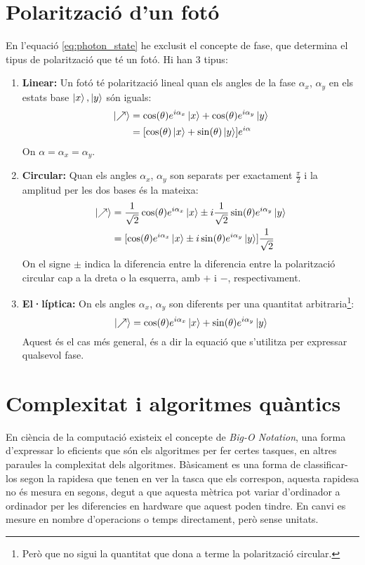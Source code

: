 \chapter{Polarització d'un fotó}
\label{appendix:optics}
En l'equació \ref{eq:photon_state} he exclusit el concepte de fase, que determina el tipus de polarització que té un fotó. Hi han 3 tipus:
\begin{enumerate}
	\item \textbf{Linear:}
	Un fotó té polarització lineal quan els angles de la fase $\alpha_x$, $\alpha_y$ en els estats base $\ket{x},\ket{y}$ són iguals:
	\begin{align*}
		\ket{\nearrow} &= \cos(\theta) e^{i\alpha_x}\ket{x} + \cos(\theta)e^{i\alpha_y}\ket{y} \\
		&= [\cos(\theta)\ket{x} + \sin(\theta)\ket{y}]e^{i\alpha}
	\end{align*}
	On $\alpha=\alpha_x=\alpha_y$.
	
	\item \textbf{Circular:}
	Quan els angles $\alpha_x$, $\alpha_y$ son separats per exactament $\frac{\pi}{2}$ i la amplitud per les dos bases és la mateixa:
	\begin{align*}
		\ket{\nearrow} &= \frac{1}{\sqrt{2}}\cos(\theta)e^{i\alpha_x}\ket{x} \pm i\frac{1}{\sqrt{2}}\sin(\theta)e^{i\alpha_y}\ket{y} \\
					   &= [\cos(\theta)e^{i\alpha_x}\ket{x} \pm i\sin(\theta)e^{i\alpha_y}\ket{y}]\frac{1}{\sqrt{2}}
	\end{align*}
On el signe $\pm$ indica la diferencia entre la diferencia entre la polarització circular cap a la dreta o la esquerra, amb $+$ i $-$, respectivament.

	\item \textbf{El·líptica:}
	On els angles $\alpha_x$, $\alpha_y$ son diferents per una quantitat arbitraria\footnote{Però que no sigui la quantitat que dona a terme la polarització circular.}:
	$$
	\ket{\nearrow} = \cos(\theta)e^{i\alpha_x}\ket{x} + \sin(\theta)e^{i\alpha_y}\ket{y}
	$$
	Aquest és el cas més general, és a dir la equació que s'utilitza per expressar qualsevol fase.
	
\end{enumerate}

\chapter{Complexitat i algoritmes quàntics}
\label{complexity}
En ciència de la computació existeix el concepte de \textit{Big-O Notation}, una forma d'expressar lo eficients que són els algoritmes per fer certes tasques, en altres paraules la complexitat dels algoritmes. Bàsicament es una forma de classificar-los segon la rapidesa que tenen en ver la tasca que els correspon, aquesta rapidesa no és mesura en segons, degut a que aquesta mètrica pot variar d'ordinador a ordinador per les diferencies en hardware que aquest poden tindre. En canvi es mesure en nombre d'operacions o temps directament, però sense unitats. 

